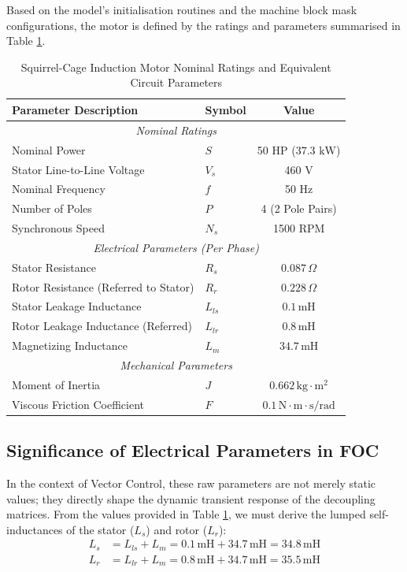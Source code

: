 \documentclass[12pt]{article}
\begin{document}
Based on the model's initialisation routines and the machine block mask configurations, the motor is defined by the ratings and parameters summarised in Table \ref{tab:im_params}.

\begin{table}[ht]
\centering
\caption{Squirrel-Cage Induction Motor Nominal Ratings and Equivalent Circuit Parameters}
\label{tab:im_params}
\vspace{0.2cm}
\begin{tabular}{@{}llc@{}}
\toprule
\textbf{Parameter Description} & \textbf{Symbol} & \textbf{Value} \\
\midrule
\multicolumn{3}{c}{\textit{Nominal Ratings}} \\
\midrule
Nominal Power & $S$ & 50 HP ($37.3 \text{ kW}$) \\
Stator Line-to-Line Voltage & $V_s$ & 460 V \\
Nominal Frequency & $f$ & 50 Hz \\
Number of Poles & $P$ & 4 (2 Pole Pairs) \\
Synchronous Speed & $N_s$ & 1500 RPM \\
\midrule
\multicolumn{3}{c}{\textit{Electrical Parameters (Per Phase)}} \\
\midrule
Stator Resistance & $R_s$ & $0.087 \, \Omega$ \\
Rotor Resistance (Referred to Stator) & $R_r$ & $0.228 \, \Omega$ \\
Stator Leakage Inductance & $L_{ls}$ & $0.1 \, \text{mH}$ \\
Rotor Leakage Inductance (Referred) & $L_{lr}$ & $0.8 \, \text{mH}$ \\
Magnetizing Inductance & $L_m$ & $34.7 \, \text{mH}$ \\
\midrule
\multicolumn{3}{c}{\textit{Mechanical Parameters}} \\
\midrule
Moment of Inertia & $J$ & $0.662 \, \text{kg}\cdot\text{m}^2$ \\
Viscous Friction Coefficient & $F$ & $0.1 \, \text{N}\cdot\text{m}\cdot\text{s/rad}$ \\
\bottomrule
\end{tabular}
\end{table}

\subsection{Significance of Electrical Parameters in FOC}
In the context of Vector Control, these raw parameters are not merely static values; they directly shape the dynamic transient response of the decoupling matrices. From the values provided in Table \ref{tab:im_params}, we must derive the lumped self-inductances of the stator ($L_s$) and rotor ($L_r$):
\begin{align}
    L_s &= L_{ls} + L_m = 0.1 \, \text{mH} + 34.7 \, \text{mH} = 34.8 \, \text{mH} \\
    L_r &= L_{lr} + L_m = 0.8 \, \text{mH} + 34.7 \, \text{mH} = 35.5 \, \text{mH}
\end{align}
\end{document}
